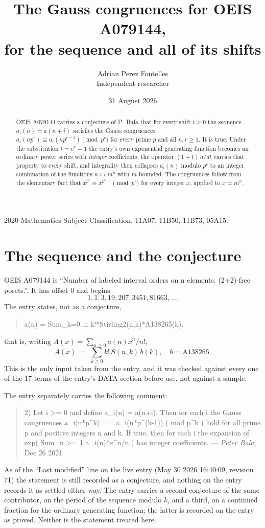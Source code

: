 \documentclass[11pt,a4paper]{article}
\title{The Gauss congruences for OEIS A079144,\\ for the sequence and all of its shifts}
\author{Adrian Perez Fontelles\\ \small Independent researcher}
\date{31 August 2026}
\theoremstyle{plain}
\theoremstyle{definition}
\begin{document}
\maketitle

\begin{abstract}
OEIS A079144 carries a conjecture of P.~Bala that for every shift $i\ge0$ the sequence
$a_i(n)=a(n+i)$ satisfies the Gauss congruences
$a_i(np^{r})\equiv a_i(np^{r-1})\pmod{p^{r}}$ for every prime $p$ and all $n,r\ge1$.
It is true. Under the substitution $t=e^{x}-1$ the entry's own exponential generating
function becomes an ordinary power series with \emph{integer} coefficients; the operator
$(1+t)\,d/dt$ carries that property to every shift, and integrality then collapses
$a_i(n)$ modulo $p^{r}$ to an integer combination of the functions $n\mapsto m^{n}$ with
$m$ bounded. The congruences follow from the elementary fact that
$x^{p^{r}}\equiv x^{p^{r-1}}\pmod{p^{r}}$ for every integer $x$, applied to $x=m^{n}$.
\end{abstract}

\noindent\small 2020 Mathematics Subject Classification. 11A07, 11B50, 11B73, 05A15.\normalsize

\section{The sequence and the conjecture}

OEIS A079144 is ``Number of labeled interval orders on n elements: (2+2)-free posets.''. It has offset $0$ and begins
\[
1, 1, 3, 19, 207, 3451, 81663,\ \dots
\]
The entry states, not as a conjecture,
\begin{quote}\small
a(n) = Sum\_{k=0..n} k!*Stirling2(n,k)*A138265(k).
\end{quote}
that is, writing $A(x)=\sum_{n\ge0}a(n)x^{n}/n!$,
\begin{equation}\label{eq:egf}
A(x)\;=\;\sum_{k\ge 0} k!\,S(n,k)\,b(k),\quad b=\text{A138265}.
\end{equation}
This is the only input taken from the entry, and it was checked against every one of the
$17$ terms of the entry's DATA section before use, not against a sample.

The entry separately carries the following comment:
\begin{quote}\small
2) Let i >= 0 and define a\_i(n) = a(n+i). Then for each i the Gauss congruences a\_i(n*p\^{}k) == a\_i(n*p\^{}(k-1)) ( mod p\^{}k ) hold for all prime p and positive integers n and k. If true, then for each i the expansion of exp( Sum\_{n >= 1} a\_i(n)*x\^{}n/n ) has integer coefficients. --- \emph{Peter Bala}, Dec 26 2021
\end{quote}
As of the ``Last modified'' line on the live entry (May 30 2026 16:40:09, revision
71) the statement is still recorded as a conjecture, and nothing on the entry
records it as settled either way. The entry carries a second conjecture of the same contributor, on the period of the sequence modulo $k$, and a third, on a continued fraction for the ordinary generating function; the latter is recorded on the entry as proved. Neither is the statement treated here.
\end{document}
